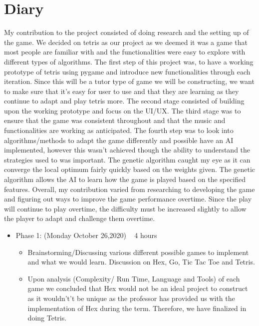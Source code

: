 \documentclass{article}
\begin{document}
\section{Diary}
My contribution to the project consisted of doing research and the setting up of the game. We decided on tetris as our project as we deemed it was a game that most people are familiar with and the functionalities were easy to explore with different types of algorithms. The first step of this project was, to have a working prototype of tetris using pygame and introduce new functionalities through each iteration. Since this will be a tutor type of game we will be constructing, we want to make sure that it's easy for user to use and that they are learning as they continue to adapt and play tetris more. The second stage consisted of building upon the working prototype and focus on the UI/UX.
The third stage was to ensure that the game was consistent throughout and that the music and functionalities are working as anticipated. The fourth step was to look into algorithms/methods to adapt the game differently and possible have an AI implemented, however this wasn't achieved though the ability to understand the strategies used to was important. The genetic algorithm caught my eye as it can converge the local optimum fairly quickly based on the weights given. The genetic algorithm allows the AI to learn how the game is played based on the specified features. Overall, my contribution varied from researching to developing the game and figuring out ways to improve the game performance overtime. Since the play will continue to play overtime, the difficulty must be increased slightly to allow the player to adapt and challenge them overtime.\newline

\begin{itemize}
\item Phase 1: (Monday October 26,2020) ~ 4 hours
\begin{itemize}
\item Brainstorming/Discussing various different possible games to implement and what we would learn. Discussion on Hex, Go, Tic Tac Toe and Tetris.
\item  Upon analysis (Complexity/ Run Time, Language and Tools) of each game we concluded that Hex would not be an ideal project to construct as it wouldn't’t be unique as the professor has provided us with the implementation of Hex during the term. Therefore, we have finalized in doing Tetris.\newline
\end{itemize}

\end{itemize}
\end{document}
